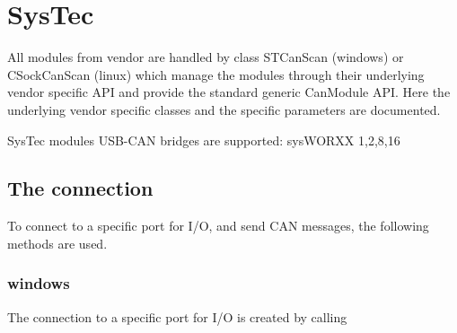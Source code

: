 \documentclass[letterpaper,10pt,english]{sphinxmanual}
\begin{document}
\chapter{SysTec}
\label{\detokenize{vendors/systec:systec}}\label{\detokenize{vendors/systec::doc}}
All modules from vendor {\hyperref[\detokenize{vendors/systec:systec}]{}} are handled by class STCanScan (windows) or CSockCanScan (linux) which
manage the modules through their underlying vendor specific API and provide the standard generic CanModule API.
Here the underlying vendor specific classes and the specific parameters are documented.

SysTec modules USB-CAN bridges are supported: sysWORXX 1,2,8,16


\section{The connection}
\label{\detokenize{vendors/systec:the-connection}}
To connect to a specific port for I/O, and send CAN messages, the following methods are used.


\subsection{windows}
\label{\detokenize{vendors/systec:windows}}
The connection to a specific port for I/O is created by calling
\end{document}
